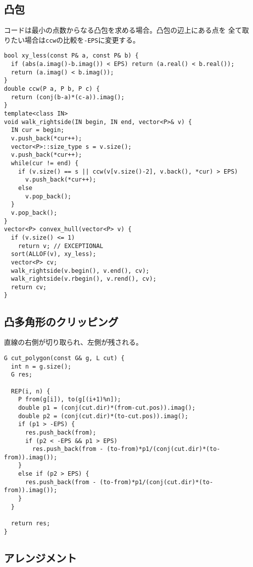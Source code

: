 \subsection{凸包}

コードは最小の点数からなる凸包を求める場合。凸包の辺上にある点を
全て取りたい場合は\verb|ccw|の比較を\verb|-EPS|に変更する。

\begin{lstlisting}
bool xy_less(const P& a, const P& b) {
  if (abs(a.imag()-b.imag()) < EPS) return (a.real() < b.real());
  return (a.imag() < b.imag());
}
double ccw(P a, P b, P c) {
  return (conj(b-a)*(c-a)).imag();
}
template<class IN>
void walk_rightside(IN begin, IN end, vector<P>& v) {
  IN cur = begin;
  v.push_back(*cur++);
  vector<P>::size_type s = v.size();
  v.push_back(*cur++);
  while(cur != end) {
    if (v.size() == s || ccw(v[v.size()-2], v.back(), *cur) > EPS)
      v.push_back(*cur++);
    else
      v.pop_back();
  }
  v.pop_back();
}
vector<P> convex_hull(vector<P> v) {
  if (v.size() <= 1)
    return v; // EXCEPTIONAL
  sort(ALLOF(v), xy_less);
  vector<P> cv;
  walk_rightside(v.begin(), v.end(), cv);
  walk_rightside(v.rbegin(), v.rend(), cv);
  return cv;
}
\end{lstlisting}


\subsection{凸多角形のクリッピング}

直線の右側が切り取られ、左側が残される。

\begin{lstlisting}
G cut_polygon(const G& g, L cut) {
  int n = g.size();
  G res;

  REP(i, n) {
    P from(g[i]), to(g[(i+1)%n]);
    double p1 = (conj(cut.dir)*(from-cut.pos)).imag();
    double p2 = (conj(cut.dir)*(to-cut.pos)).imag();
    if (p1 > -EPS) {
      res.push_back(from);
      if (p2 < -EPS && p1 > EPS)
        res.push_back(from - (to-from)*p1/(conj(cut.dir)*(to-from)).imag());
    }
    else if (p2 > EPS) {
      res.push_back(from - (to-from)*p1/(conj(cut.dir)*(to-from)).imag());
    }
  }

  return res;
}
\end{lstlisting}


\subsection{アレンジメント}


